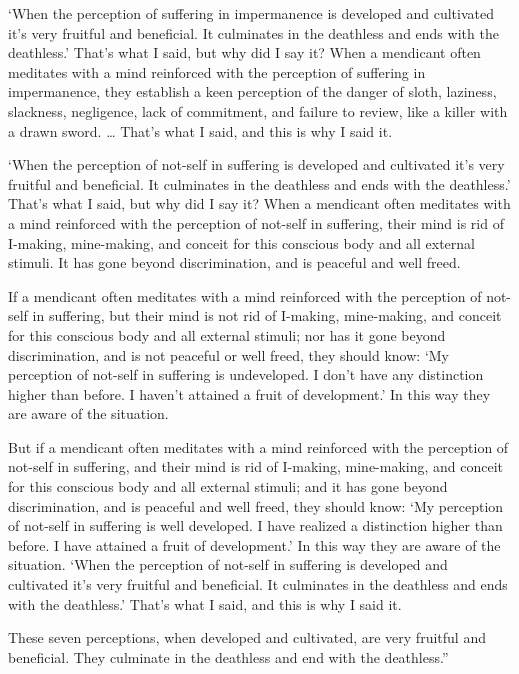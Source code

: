\documentclass[12pt,openany]{book}%
\begin{document}
‘When the perception of suffering in impermanence is developed and cultivated it’s very fruitful and beneficial. It culminates in the deathless and ends with the deathless.’ That’s what I said, but why did I say it? When a mendicant often meditates with a mind reinforced with the perception of suffering in impermanence, they establish a keen perception of the danger of sloth, laziness, slackness, negligence, lack of commitment, and failure to review, like a killer with a drawn sword. … That’s what I said, and this is why I said it. 

‘When the perception of not-self in suffering is developed and cultivated it’s very fruitful and beneficial. It culminates in the deathless and ends with the deathless.’ That’s what I said, but why did I say it? When a mendicant often meditates with a mind reinforced with the perception of not-self in suffering, their mind is rid of I-making, mine-making, and conceit for this conscious body and all external stimuli. It has gone beyond discrimination, and is peaceful and well freed. 

If a mendicant often meditates with a mind reinforced with the perception of not-self in suffering, but their mind is not rid of I-making, mine-making, and conceit for this conscious body and all external stimuli; nor has it gone beyond discrimination, and is not peaceful or well freed, they should know: ‘My perception of not-self in suffering is undeveloped. I don’t have any distinction higher than before. I haven’t attained a fruit of development.’ In this way they are aware of the situation. 

But if a mendicant often meditates with a mind reinforced with the perception of not-self in suffering, and their mind is rid of I-making, mine-making, and conceit for this conscious body and all external stimuli; and it has gone beyond discrimination, and is peaceful and well freed, they should know: ‘My perception of not-self in suffering is well developed. I have realized a distinction higher than before. I have attained a fruit of development.’ In this way they are aware of the situation. ‘When the perception of not-self in suffering is developed and cultivated it’s very fruitful and beneficial. It culminates in the deathless and ends with the deathless.’ That’s what I said, and this is why I said it. 

These seven perceptions, when developed and cultivated, are very fruitful and beneficial. They culminate in the deathless and end with the deathless.” 
\end{document}
